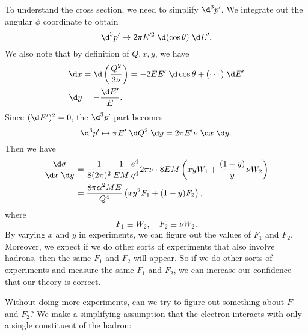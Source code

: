 \documentclass[a4paper]{article}
\begin{document}
To understand the cross section, we need to simplify $\d^3 p'$. We integrate out the angular $\phi$ coordinate to obtain
\[
  \d^3 p' \mapsto 2\pi E'^2 \;\d (\cos \theta)\;\d E'.
\]
We also note that by definition of $Q, x, y$, we have
\begin{align*}
  \d x &= \d \left(\frac{Q^2}{2\nu}\right) = - 2EE' \;\d \cos \theta + (\cdots)\;\d E'\\
  \d y &= -\frac{\d E'}{E}.
\end{align*}
Since $(\d E')^2 = 0$, the $\d^3 p'$ part becomes
\[
  \d^3 p' \mapsto \pi E'\;\d Q^2\;\d y = 2\pi E' \nu\;\d x\;\d y.
\]
Then we have
\begin{align*}
  \frac{\d \sigma}{\d x\; \d y} &= \frac{1}{8(2\pi)^2} \frac{1}{EM} \frac{e^4}{q^4} 2\pi \nu \cdot 8EM\left(xy W_1 + \frac{(1 - y)}{y} \nu W_2\right)\\
  &= \frac{8 \pi \alpha^2 ME}{Q^4}\left( xy^2 F_1 + (1 - y) F_2\right),
\end{align*}
where
\[
  F_1 \equiv W_2,\quad F_2 \equiv \nu W_2.
\]
By varying $x$ and $y$ in experiments, we can figure out the values of $F_1$ and $F_2$. Moreover, we expect if we do other sorts of experiments that also involve hadrons, then the same $F_1$ and $F_2$ will appear. So if we do other sorts of experiments and measure the same $F_1$ and $F_2$, we can increase our confidence that our theory is correct.

Without doing more experiments, can we try to figure out something about $F_1$ and $F_2$? We make a simplifying assumption that the electron interacts with only a single constituent of the hadron:
\begin{center}
\end{center}
\end{document}
